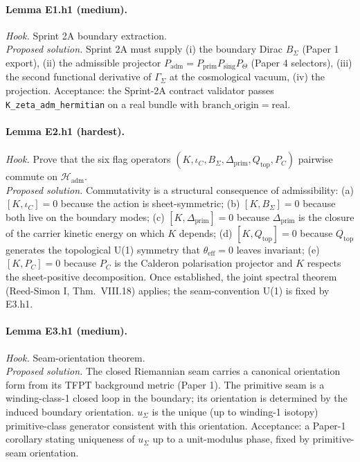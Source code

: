 \documentclass[11pt,a4paper]{article}
\begin{document}
\paragraph{Lemma E1.h1 (medium).}
\emph{Hook.}  Sprint 2A boundary extraction.\\
\emph{Proposed solution.}  Sprint 2A must supply (i) the boundary
Dirac \(B_\Sigma\) (Paper 1 export), (ii) the admissible projector
\(P_{\mathrm{adm}}=P_{\mathrm{prim}}P_{\mathrm{sing}}P_\Theta\)
(Paper 4 selectors), (iii) the second functional derivative of
\(\Gamma_\Sigma\) at the cosmological vacuum, (iv) the projection.
Acceptance: the Sprint-2A contract validator passes
\texttt{K\_zeta\_adm\_hermitian} on a real bundle with
\(\mathrm{branch\_origin}=\mathrm{real}\).

\paragraph{Lemma E2.h1 (hardest).}
\emph{Hook.}  Prove that the six flag operators
\((K,\iota_C,B_\Sigma,\Delta_{\mathrm{prim}},Q_{\mathrm{top}},P_C)\)
pairwise commute on \(\mathcal H_{\mathrm{adm}}\).\\
\emph{Proposed solution.}  Commutativity is a structural consequence
of admissibility:
(a) \([K,\iota_C]=0\) because the action is sheet-symmetric;
(b) \([K,B_\Sigma]=0\) because both live on the boundary modes;
(c) \([K,\Delta_{\mathrm{prim}}]=0\) because \(\Delta_{\mathrm{prim}}\)
is the closure of the carrier kinetic energy on which \(K\) depends;
(d) \([K,Q_{\mathrm{top}}]=0\) because \(Q_{\mathrm{top}}\) generates
the topological U(1) symmetry that \(\theta_{\mathrm{eff}}=0\) leaves
invariant;
(e) \([K,P_C]=0\) because \(P_C\) is the Calderon polarisation
projector and \(K\) respects the sheet-positive decomposition.  Once
established, the joint spectral theorem (Reed-Simon I, Thm.\ VIII.18)
applies; the seam-convention U(1) is fixed by E3.h1.

\paragraph{Lemma E3.h1 (medium).}
\emph{Hook.}  Seam-orientation theorem.\\
\emph{Proposed solution.}  The closed Riemannian seam carries a
canonical orientation form from its TFPT background metric (Paper 1).
The primitive seam is a winding-class-1 closed loop in the boundary;
its orientation is determined by the induced boundary orientation.
\(u_\Sigma\) is the unique (up to winding-1 isotopy) primitive-class
generator consistent with this orientation.  Acceptance: a Paper-1
corollary stating uniqueness of \(u_\Sigma\) up to a unit-modulus
phase, fixed by primitive-seam orientation.
\end{document}
